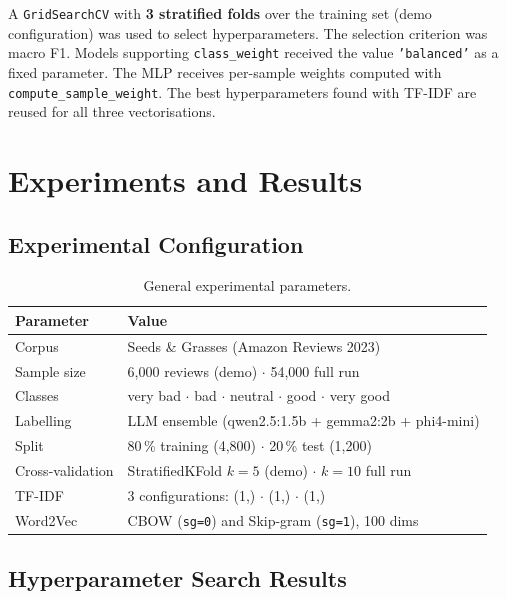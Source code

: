 \documentclass[12pt, letterpaper]{article}
\begin{document}
A \texttt{GridSearchCV} with \textbf{3 stratified folds} over the training
set (demo configuration) was used to select hyperparameters. The selection
criterion was macro F1. Models supporting \texttt{class\_weight} received the
value \texttt{'balanced'} as a fixed parameter. The MLP receives per-sample
weights computed with \texttt{compute\_sample\_weight}. The best
hyperparameters found with TF-IDF are reused for all three vectorisations.

\section{Experiments and Results}

\subsection{Experimental Configuration}

\begin{table}[h!]
\centering
\caption{General experimental parameters.}
\label{tab:config}
\begin{tabular}{L{4.5cm} L{9cm}}
\toprule
\textbf{Parameter} & \textbf{Value} \\
\midrule
Corpus & Seeds \& Grasses (Amazon Reviews 2023) \\
Sample size & 6,000 reviews (demo) $\cdot$ 54,000 full run \\
Classes & very bad $\cdot$ bad $\cdot$ neutral $\cdot$ good $\cdot$ very good \\
Labelling & LLM ensemble (qwen2.5:1.5b + gemma2:2b + phi4-mini) \\
Split & 80\,\% training (4,800) $\cdot$ 20\,\% test (1,200) \\
Cross-validation & StratifiedKFold $k=5$ (demo) $\cdot$ $k=10$ full run \\
TF-IDF & 3 configurations: (1,) $\cdot$ (1,) $\cdot$ (1,) \\
Word2Vec & CBOW (\texttt{sg=0}) and Skip-gram (\texttt{sg=1}), 100 dims \\
\bottomrule
\end{tabular}
\end{table}

\subsection{Hyperparameter Search Results}
\end{document}
